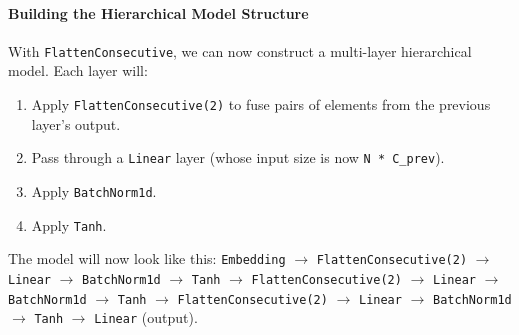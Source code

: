 \paragraph{Building the Hierarchical Model Structure}
With \texttt{FlattenConsecutive}, we can now construct a multi-layer hierarchical model. Each layer will:
\begin{enumerate}
    \item Apply \texttt{FlattenConsecutive(2)} to fuse pairs of elements from the previous layer's output.
    \item Pass through a \texttt{Linear} layer (whose input size is now \texttt{N * C\_prev}).
    \item Apply \texttt{BatchNorm1d}.
    \item Apply \texttt{Tanh}.
\end{enumerate}

The model will now look like this:
\texttt{Embedding} $\rightarrow$ \texttt{FlattenConsecutive(2)} $\rightarrow$ \texttt{Linear} $\rightarrow$ \texttt{BatchNorm1d} $\rightarrow$ \texttt{Tanh} $\rightarrow$ \texttt{FlattenConsecutive(2)} $\rightarrow$ \texttt{Linear} $\rightarrow$ \texttt{BatchNorm1d} $\rightarrow$ \texttt{Tanh} $\rightarrow$ \texttt{FlattenConsecutive(2)} $\rightarrow$ \texttt{Linear} $\rightarrow$ \texttt{BatchNorm1d} $\rightarrow$ \texttt{Tanh} $\rightarrow$ \texttt{Linear} (output).

